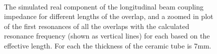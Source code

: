 \begin{figure}
\begin{center}
\\
\end{center}
\caption{ The simulated real component of the longitudinal beam coupling impedance for different lengths of the overlap, and  a zoomed in plot of the first resonances of all the overlaps with the calculated resonance frequency (shown as vertical lines) for each based on the effective length. For each the thickness of the ceramic tube is 7mm.}
\label{fig:mki-overlap-imp-tot}
\end{figure}

